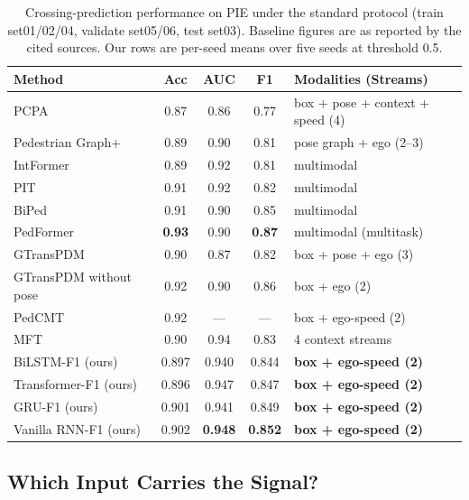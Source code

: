 \documentclass[mti,article,submit,moreauthors]{Definitions/mdpi}
\begin{document}
\begin{table}[htbp]
\caption{Crossing-prediction performance on PIE under the standard protocol (train set01/02/04, validate set05/06, test set03). Baseline figures are as reported by the cited sources. Our rows are per-seed means over five seeds at threshold 0.5.\label{tab:baselines}}
\begin{tabularx}{\textwidth}{lcccL}
\toprule
\textbf{Method} & \textbf{Acc} & \textbf{AUC} & \textbf{F1} & \textbf{Modalities (Streams)}\\
\midrule
PCPA~\citep{kotseruba2021benchmark} & 0.87 & 0.86 & 0.77 & box + pose + context + speed (4)\\
Pedestrian Graph+~\citep{cadena2022pedgraph} & 0.89 & 0.90 & 0.81 & pose graph + ego (2--3)\\
IntFormer~\citep{lorenzo2021intformer} & 0.89 & 0.92 & 0.81 & multimodal\\
PIT~\citep{zhou2023pit} & 0.91 & 0.92 & 0.82 & multimodal\\
BiPed~\citep{rasouli2023pedformer} & 0.91 & 0.90 & 0.85 & multimodal\\
PedFormer~\citep{rasouli2023pedformer} & \textbf{0.93} & 0.90 & \textbf{0.87} & multimodal (multitask)\\
GTransPDM~\citep{xie2025gtranspdm} & 0.90 & 0.87 & 0.82 & box + pose + ego (3)\\
GTransPDM without pose~\citep{xie2025gtranspdm} & 0.92 & 0.90 & 0.86 & box + ego (2)\\
PedCMT~\citep{chen2024pedcmt} & 0.92 & --- & --- & box + ego-speed (2)\\
MFT~\citep{li2025mft} & 0.90 & 0.94 & 0.83 & 4 context streams\\
\midrule
BiLSTM-F1 (ours) & 0.897 & 0.940 & 0.844 & \textbf{box + ego-speed (2)}\\
Transformer-F1 (ours) & 0.896 & 0.947 & 0.847 & \textbf{box + ego-speed (2)}\\
GRU-F1 (ours) & 0.901 & 0.941 & 0.849 & \textbf{box + ego-speed (2)}\\
Vanilla RNN-F1 (ours) & 0.902 & \textbf{0.948} & \textbf{0.852} & \textbf{box + ego-speed (2)}\\
\bottomrule
\end{tabularx}
\end{table}

\subsection{Which Input Carries the Signal?}
\label{sec:ego-ablation}
\end{document}
